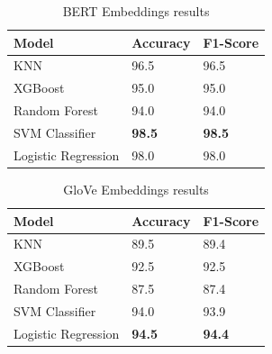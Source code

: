 \begin{table}[hbt!]
\begin{threeparttable}
\caption{BERT Embeddings results}
\label{bert_embeddings_results}
\begin{tabular}{lll}
\toprule
\headrow Model & Accuracy & F1-Score\\
\midrule
KNN & 96.5 & 96.5\\ 
XGBoost & 95.0 & 95.0\\ 
Random Forest & 94.0 & 94.0\\ 
SVM Classifier & \textbf{98.5} & \textbf{98.5}\\ 
Logistic Regression & 98.0 & 98.0\\ 
\bottomrule
\end{tabular}
\end{threeparttable}
\end{table}

\begin{table}[hbt!]
\begin{threeparttable}
\caption{GloVe Embeddings results}
\label{glove_embeddings_results}
\begin{tabular}{lll}
\toprule
\headrow Model & Accuracy & F1-Score\\
\midrule
KNN & 89.5 & 89.4 \\ 
XGBoost & 92.5 & 92.5 \\ 
Random Forest & 87.5 & 87.4 \\ 
SVM Classifier & 94.0 & 93.9 \\ 
Logistic Regression & \textbf{94.5} & \textbf{94.4} \\ 
\bottomrule
\end{tabular}
\end{threeparttable}
\end{table}

